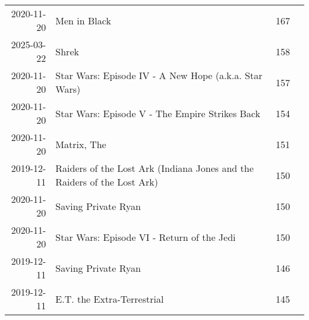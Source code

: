 \documentclass[11pt]{article}
\begin{document}
\begin{tabular}{r|lll}
	 2020-11-20                                                              & Men in Black                                                            & 167                                                                    \\
	 2025-03-22                                                              & Shrek                                                                   & 158                                                                    \\
	 2020-11-20                                                              & Star Wars: Episode IV - A New Hope (a.k.a. Star Wars)                   & 157                                                                    \\
	 2020-11-20                                                              & Star Wars: Episode V - The Empire Strikes Back                          & 154                                                                    \\
	 2020-11-20                                                              & Matrix, The                                                             & 151                                                                    \\
	 2019-12-11                                                              & Raiders of the Lost Ark (Indiana Jones and the Raiders of the Lost Ark) & 150                                                                    \\
	 2020-11-20                                                              & Saving Private Ryan                                                     & 150                                                                    \\
	 2020-11-20                                                              & Star Wars: Episode VI - Return of the Jedi                              & 150                                                                    \\
	 2019-12-11                                                              & Saving Private Ryan                                                     & 146                                                                    \\
	 2019-12-11                                                              & E.T. the Extra-Terrestrial                                              & 145                                                                    \\

\end{tabular}
\end{document}
